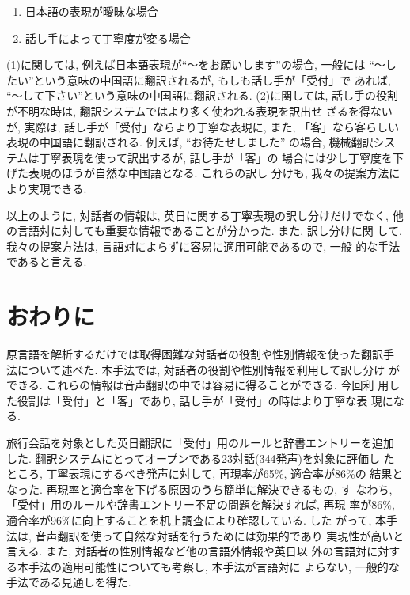 \begin{enumerate}
  \item 日本語の表現が曖昧な場合
  \item 話し手によって丁寧度が変る場合
\end{enumerate}

(1)に関しては, 例えば日本語表現が``〜をお願いします''の場合, 一般には
``〜したい''という意味の中国語に翻訳されるが, もしも話し手が「受付」で
あれば, ``〜して下さい''という意味の中国語に翻訳される. (2)に関しては, 
話し手の役割が不明な時は, 翻訳システムではより多く使われる表現を訳出せ
ざるを得ないが, 実際は, 話し手が「受付」ならより丁寧な表現に, また, 
「客」なら客らしい表現の中国語に翻訳される. 例えば, ``お待たせしました''
の場合, 機械翻訳システムは丁寧表現を使って訳出するが, 話し手が「客」の
場合には少し丁寧度を下げた表現のほうが自然な中国語となる. これらの訳し
分けも, 我々の提案方法により実現できる. 

\vspace{5mm}

以上のように, 対話者の情報は, 英日に関する丁寧表現の訳し分けだけでなく, 
他の言語対に対しても重要な情報であることが分かった. また, 訳し分けに関
して, 我々の提案方法は, 言語対によらずに容易に適用可能であるので, 一般
的な手法であると言える. 

\section{おわりに}

原言語を解析するだけでは取得困難な対話者の役割や性別情報を使った翻訳手
法について述べた. 本手法では, 対話者の役割や性別情報を利用して訳し分け
ができる. これらの情報は音声翻訳の中では容易に得ることができる. 今回利
用した役割は「受付」と「客」であり, 話し手が「受付」の時はより丁寧な表
現になる.

旅行会話を対象とした英日翻訳に「受付」用のルールと辞書エントリーを追加
した. 翻訳システムにとってオープンである23対話(344発声)を対象に評価し
たところ, 丁寧表現にするべき発声に対して, 再現率が65\%, 適合率が86\%の
結果となった. 再現率と適合率を下げる原因のうち簡単に解決できるもの, す
なわち, 「受付」用のルールや辞書エントリー不足の問題を解決すれば, 再現
率が86\%, 適合率が96\%に向上することを机上調査により確認している. した
がって, 本手法は, 音声翻訳を使って自然な対話を行うためには効果的であり
実現性が高いと言える. また, 対話者の性別情報など他の言語外情報や英日以
外の言語対に対する本手法の適用可能性についても考察し, 本手法が言語対に
よらない, 一般的な手法である見通しを得た.

